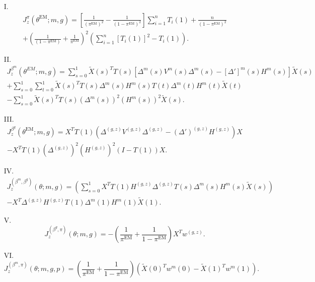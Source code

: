 \documentclass[12pt]{article}
\begin{document}
\begin{itemize}
\item[I.] \begin{multline*}
J_z^\pi(\theta^{\textrm{EM}}; m, g) = 
\left[ \frac{1}{(\pi^{\textrm{EM}})^2} - \frac{1}{ (1 - \pi^{\textrm{EM}} )^2} \right] \sum_{i=1}^n T_i(1) + \frac{n}{(1-\pi^{\textrm{EM}} )^2} \\ + \left( \frac{1}{(1 - \pi^{\textrm{EM}} )} + \frac{1}{\pi^{\textrm{EM}}} \right)^2 \left( \sum_{i=1}^n [T_i(1)]^2 - T_i(1) \right).
\end{multline*}
\item[II.] \begin{multline*}
J_z^{\beta^m}(\theta^{EM}; m, g) = \sum_{s=0}^1 \tilde{X}(s)^T T(s) \left[ {\Delta}^m(s) {V}^m(s) {\Delta}^m(s) - [{\Delta}']^m(s) {H}^m(s) \right] \tilde{X}(s)  \\ + \sum_{s=0}^1 \sum_{t=0}^1 \tilde{X}(s)^T {T}(s) {\Delta}^m(s) {H}^m(s) {T}(t) {\Delta}^m(t) {H}^m(t) \tilde{X}(t) \\ - \sum_{s=0}^1 \tilde{X}(s)^T {T}(s) ({\Delta}^m(s))^2 ({H}^m(s))^2 \tilde{X}(s).
\end{multline*}
\item[III.] \begin{multline*}
J^{\beta^g}_z\left( \theta^{\textrm{EM}}; m, g \right) =  X^T T(1) ( \Delta^{(g,z)}V^{(g,z)}\Delta^{(g,z)} - (\Delta')^{(g,z)} H^{(g,z)}) X \\ - X^T T(1) \left(\Delta^{(g,z)}\right)^2 \left( H^{(g,z)} \right)^2 \left( I - T(1) \right) X.
\end{multline*}
\item[IV.] \begin{multline*} J_z^{(\beta^m, \beta^g)}(\theta; m, g) = \left(\sum_{s=0}^1 X^T  T(1) H^{(g,z)} \Delta^{(g,z)} T(s) \Delta^m(s) H^m(s) \tilde{X}(s) \right) \\ - X^T \Delta^{(g,z)} H^{(g,z)} T(1) \Delta^m(1)H^m(1) \tilde{X}(1).
\end{multline*}
\item[V.] \begin{equation*} J^{(\beta^g, \pi)}_z(\theta; m, g) = -\left( \frac{1}{\pi^\textrm{EM}} + \frac{1}{1-\pi^\textrm{EM}} \right)X^T w^{(g,z)}. \end{equation*}
\item[VI.] \begin{equation*} J^{(\beta^m, \pi)}_z(\theta; m, g, p) = \left( \frac{1}{\pi^\textrm{EM}} + \frac{1}{1 - \pi^\textrm{EM}} \right) \left( \tilde{X}(0)^T w^m(0) - \tilde{X}(1)^T w^m(1)\right). \end{equation*}
\end{itemize}
\end{document}
